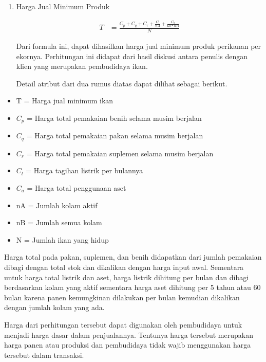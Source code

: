 \begin{spacing}{1.5}
\begin{enumerate}
	\item Harga Jual Minimum Produk
	
	\begin{equation}
		\begin{split}
			T
			&= \frac{C_p + C_q + C_r + \frac{C_l}{nA} + \frac{C_a}{60 * nB}}{N}
		\end{split}
	\end{equation}

	Dari formula ini, dapat dihasilkan harga jual minimum produk perikanan per ekornya. Perhitungan ini didapat dari hasil diskusi antara penulis dengan klien yang merupakan pembudidaya ikan.

	Detail atribut dari dua rumus diatas dapat dilihat sebagai berikut.

\end{enumerate}

\begin{itemize}
	\item T = Harga jual minimum ikan
	\item $C_p$ = Harga total pemakaian benih selama musim berjalan
	\item $C_q$ = Harga total pemakaian pakan selama musim berjalan
	\item $C_r$ = Harga total pemakaian suplemen selama musim berjalan
	\item $C_l$ = Harga tagihan listrik per bulannya
	\item $C_a$ = Harga total penggunaan aset
	\item nA = Jumlah kolam aktif
	\item nB = Jumlah semua kolam
	\item N = Jumlah ikan yang hidup
\end{itemize}

Harga total pada pakan, suplemen, dan benih didapatkan dari jumlah pemakaian dibagi dengan total stok dan dikalikan dengan harga input awal. Sementara untuk harga total listrik dan aset, harga listrik dihitung per bulan dan dibagi berdasarkan kolam yang aktif sementara harga aset dihitung per 5 tahun atau 60 bulan karena panen kemungkinan dilakukan per bulan kemudian dikalikan dengan jumlah kolam yang ada.

Harga dari perhitungan tersebut dapat digunakan oleh pembudidaya untuk menjadi harga dasar dalam penjualannya. Tentunya harga tersebut merupakan harga panen atau produksi dan pembudidaya tidak wajib menggunakan harga tersebut dalam transaksi.



\end{spacing}
